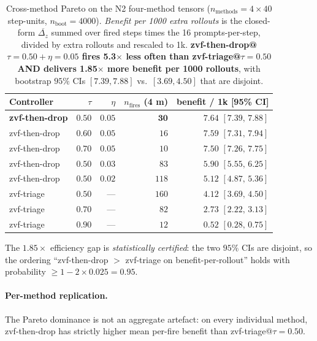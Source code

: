 \documentclass{article}
\begin{document}
\begin{table}[t]
\centering
\caption{Cross-method Pareto on the N2 four-method tensors
($n_{\mathrm{methods}}{=}4 \times 40$ step-units, $n_{\mathrm{boot}}{=}4000$).
\emph{Benefit per 1000 extra rollouts} is the closed-form
$\overline{\Delta_z}$ summed over fired steps times the 16
prompts-per-step, divided by extra rollouts and rescaled to 1k.
\textbf{zvf-then-drop@$\tau{=}0.50{+}\eta{=}0.05$ fires 5.3$\times$ less
often than zvf-triage@$\tau{=}0.50$ AND delivers 1.85$\times$ more
benefit per 1000 rollouts}, with bootstrap $95\%$ CIs $[7.39, 7.88]$
vs.\ $[3.69, 4.50]$ that are disjoint.}
\label{tab:p7-iter91-pareto}
\begin{tabular}{lrrrr}
\toprule
\textbf{Controller} & $\tau$ & $\eta$ & $n_{\mathrm{fires}}$ (4 m) & benefit / 1k [95\% CI] \\
\midrule
\textbf{zvf-then-drop} & $0.50$ & $\mathbf{0.05}$ & $\mathbf{30}$ & $\mathbf{7.64}$ $[7.39,\, 7.88]$ \\
zvf-then-drop           & $0.60$ & $0.05$ & $16$        & $7.59$ $[7.31,\, 7.94]$ \\
zvf-then-drop           & $0.70$ & $0.05$ & $10$        & $7.50$ $[7.26,\, 7.75]$ \\
zvf-then-drop           & $0.50$ & $0.03$ & $83$        & $5.90$ $[5.55,\, 6.25]$ \\
zvf-then-drop           & $0.50$ & $0.02$ & $118$       & $5.12$ $[4.87,\, 5.36]$ \\
\midrule
zvf-triage              & $0.50$ & ---    & $160$       & $4.12$ $[3.69,\, 4.50]$ \\
zvf-triage              & $0.70$ & ---    & $82$        & $2.73$ $[2.22,\, 3.13]$ \\
zvf-triage              & $0.90$ & ---    & $12$        & $0.52$ $[0.28,\, 0.75]$ \\
\bottomrule
\end{tabular}
\end{table}

The $1.85\times$ efficiency gap is \emph{statistically certified}:
the two $95\%$ CIs are disjoint, so the ordering
``zvf-then-drop $>$ zvf-triage on benefit-per-rollout'' holds with
probability $\ge 1 - 2\times 0.025 = 0.95$.

\paragraph{Per-method replication.}
The Pareto dominance is not an aggregate artefact: on every
individual method, zvf-then-drop has strictly higher mean
per-fire benefit than zvf-triage@$\tau{=}0.50$.
\end{document}
